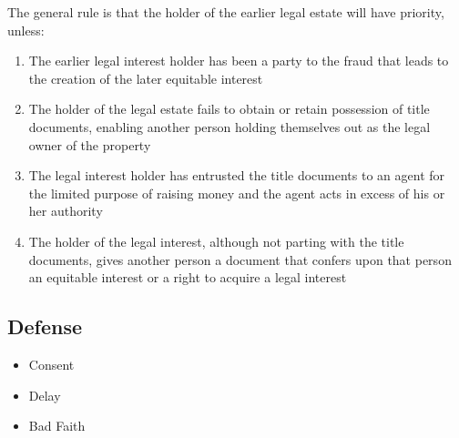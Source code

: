 The general rule is that the holder of the earlier legal estate will have priority,
unless:
\begin{enumerate}
    \item The earlier legal interest holder has been a party to the fraud that leads to the
creation of the later equitable interest
    \item The holder of the legal estate fails to obtain or retain possession of title documents,
enabling another person holding themselves out as the legal owner of the property
    \item The legal interest holder has entrusted the title documents to an agent for the limited
purpose of raising money and the agent acts in excess of his or her authority
    \item The holder of the legal interest, although not parting with the title documents, gives
another person a document that confers upon that person an equitable interest or a
right to acquire a legal interest
\end{enumerate}


\subsection*{Defense}
\begin{itemize}
    \item Consent
    \item Delay
    \item Bad Faith
\end{itemize}
